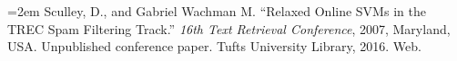 \documentclass[cs,proposal]{hmcclinic}
\begin{document}
\hangindent=2em
\noindent Sculley, D., and Gabriel Wachman M. ``Relaxed Online SVMs in the TREC Spam Filtering Track.'' \textit{16th Text Retrieval Conference}, 2007, Maryland, USA. Unpublished conference paper. Tufts University Library, 2016. Web.

\newpage











\nocite{*} 


\end{document}
